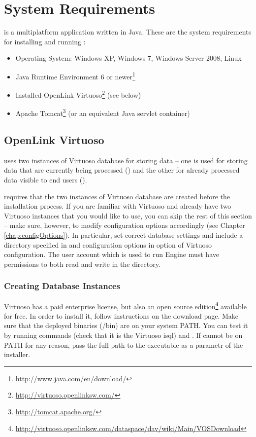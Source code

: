 \chapter{System Requirements}
\label{chap:requirements}
\odcs is a multiplatform application written in Java. These are the system requirements for installing and running \odcs:

\begin{itemize}
  \item Operating System: Windows XP, Windows 7, Windows Server 2008, Linux
  \item Java Runtime Environment 6 or newer\footnote{\url{http://www.java.com/en/download/}}
  \item Installed OpenLink Virtuoso\footnote{\url{http://virtuoso.openlinksw.com/}} (see below)
  \item Apache Tomcat\footnote{\url{http://tomcat.apache.org/}} (or an equivalent Java servlet container)
\end{itemize}


\section{OpenLink Virtuoso}
\label{sec:virtuoso}
\odcs uses two instances of Virtuoso database for storing data -- one is used for storing data that are currently being processed () and the other for already processed data visible to end users (). 

\odcs requires that the two instances of Virtuoso database are created before the installation process. If you are familiar with Virtuoso and already have two Virtuoso instances that you would like to use, you can skip the rest of this section -- make sure, however, to modify \odcs configuration options accordingly  (see Chapter \ref{chap:configOptions}). In particular, set correct database settings and include a directory specified in  and  configuration options in  option of Virtuoso configuration. The user account which is used to run Engine must have permissions to both read and write in the directory.

\subsection{Creating Database Instances}
Virtuoso has a paid enterprise license, but also an open source edition\footnote{\url{http://virtuoso.openlinksw.com/dataspace/dav/wiki/Main/VOSDownload}} available for free. In order to install it, follow instructions on the download page. Make sure that the deployed binaries (/bin) are on your system PATH. You can test it by running commands  (check that it is the Virtuoso isql) and . If  cannot be on PATH for any reason, pass the full path to the executable as a parametr of the installer.

